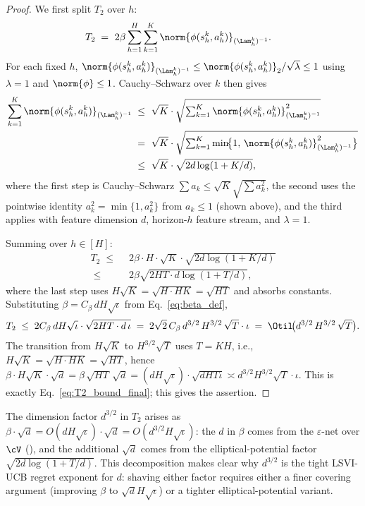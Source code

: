 \begin{proof}
We first split $T_2$ over $h$:
\begin{align*}
T_2
\;=\; & ~ 2 \beta \sum_{h=1}^H \sum_{k=1}^K \norm{\phi(s_h^k, a_h^k)}_{(\Lam_h^k)^{-1}}.
\end{align*}
For each fixed $h$, $\norm{\phi(s_h^k, a_h^k)}_{(\Lam_h^k)^{-1}} \le \norm{\phi(s_h^k, a_h^k)}_2 / \sqrt{\lambda} \le 1$ using $\lambda = 1$ and $\norm{\phi} \le 1$. Cauchy--Schwarz over $k$ then gives
\begin{align*}
\sum_{k=1}^K \norm{\phi(s_h^k, a_h^k)}_{(\Lam_h^k)^{-1}}
\;\le\; & ~ \sqrt{K} \cdot \sqrt{\textstyle \sum_{k=1}^K \norm{\phi(s_h^k, a_h^k)}_{(\Lam_h^k)^{-1}}^2} \\
\;=\; & ~ \sqrt{K} \cdot \sqrt{\textstyle \sum_{k=1}^K \min\!\bigl\{1,\, \norm{\phi(s_h^k, a_h^k)}_{(\Lam_h^k)^{-1}}^2\bigr\}} \\
\;\le\; & ~ \sqrt{K} \cdot \sqrt{2 d \log(1 + K / d)},
\end{align*}
where the first step is Cauchy--Schwarz $\sum a_k \le \sqrt{K}\sqrt{\sum a_k^2}$, the second uses the pointwise identity $a_k^2 = \min\{1, a_k^2\}$ from $a_k \le 1$ (shown above), and the third applies  with feature dimension $d$, horizon-$h$ feature stream, and $\lambda = 1$.

Summing over $h \in [H]$:
\begin{align*}
T_2
\;\le\; & ~ 2 \beta \cdot H \cdot \sqrt{K} \cdot \sqrt{2 d \log(1 + K/d)} \\
\;\le\; & ~ 2 \beta \sqrt{2 H T \cdot d \log(1 + T/d)},
\end{align*}
where the last step uses $H \sqrt{K} = \sqrt{H \cdot H K} = \sqrt{H T}$ and absorbs constants. Substituting $\beta = C_\beta\, d H \sqrt{\iota}$ from Eq.~\eqref{eq:beta_def},
\begin{align*}
T_2 \;\le\; 2 C_\beta\, d H \sqrt{\iota} \cdot \sqrt{2 H T \cdot d\, \iota}
\;=\; 2 \sqrt{2}\, C_\beta\, d^{3/2}\, H^{3/2}\, \sqrt{T} \cdot \iota
\;=\; \Otil\!\bigl( d^{3/2}\, H^{3/2}\, \sqrt{T} \bigr).
\end{align*}
The transition from $H \sqrt K$ to $H^{3/2} \sqrt T$ uses $T = K H$, i.e., $H\sqrt K = \sqrt{H \cdot H K} = \sqrt{HT}$, hence $\beta \cdot H \sqrt K \cdot \sqrt d = \beta\, \sqrt{HT}\, \sqrt{d} = (dH\sqrt\iota) \cdot \sqrt{dHT\iota} \asymp d^{3/2} H^{3/2}\sqrt T \cdot \iota$. This is exactly Eq.~\eqref{eq:T2_bound_final}; this gives the assertion.
\end{proof}

\begin{remark}\label{rem:T2_d_three_halves}
The dimension factor $d^{3/2}$ in $T_2$ arises as $\beta \cdot \sqrt{d} = O(dH\sqrt\iota) \cdot \sqrt{d} = O(d^{3/2} H \sqrt\iota)$: the $d$ in $\beta$ comes from the $\varepsilon$-net over $\cV$ (), and the additional $\sqrt{d}$ comes from the elliptical-potential factor $\sqrt{2 d \log(1 + T/d)}$. This decomposition makes clear why $d^{3/2}$ is the tight LSVI-UCB regret exponent for $d$: shaving either factor requires either a finer covering argument (improving $\beta$ to $\sqrt{d} H \sqrt\iota$) or a tighter elliptical-potential variant.
\end{remark}
